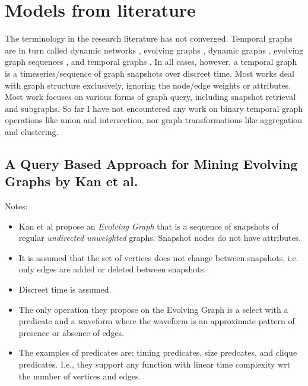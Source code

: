 \documentclass[10pt]{article}
\begin{document}
\section{Models from literature}

The terminology in the research literature has not converged. Temporal graphs are in turn called dynamic networks \cite{Lerman2010,Jin2007,Lahiri2008}, evolving graphs \cite{Kan2009,Chan2008,Han2014,Aggarwal2010}, dynamic graphs \cite{Vaquero2014,Borgwardt2006}, evolving graph sequences \cite{Ren2011}, and temporal graphs \cite{Wu2014}.  In all cases, however, a temporal graph is a timeseries/sequence of graph snapshots over discreet time. Most works deal with graph structure exclusively, ignoring the node/edge weights or attributes. Most work focuses on various forms of graph query, including snapshot retrieval and subgraphs. So far I have not encountered any work on binary temporal graph operations like union and intersection, nor graph transformations like aggregation and clustering.

\subsection{A Query Based Approach for Mining Evolving Graphs by Kan et al. \cite{Kan2009}}

Notes:
\begin{itemize}

\item Kan et al propose an {\em Evolving Graph} that is a sequence of snapshots of regular {\em undirected unweighted} graphs. Snapshot nodes do not have attributes.
\item It is assumed that the set of vertices does not change between snapshots, i.e. only edges are added or deleted between snapshots.
\item Discreet time is assumed.
\item The only operation they propose on the Evolving Graph is a select with a predicate and a waveform where the waveform is an approximate pattern of presence or absence of edges.
\item The examples of predicates are: timing predicates, size predcates, and clique predicates. I.e., they support any function with linear time complexity wrt the number of vertices and edges.

\end{itemize}
\end{document}
